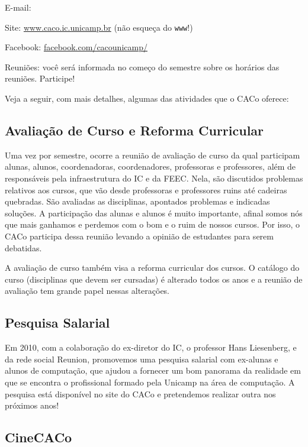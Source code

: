 \begin{compactitemize}
\item E-mail: 
\item Site: \url{www.caco.ic.unicamp.br} (não esqueça do \texttt{www}!)
\item Facebook: \url{facebook.com/cacounicamp/}
\item Reuniões: você será informada no começo do semestre sobre os horários das
reuniões. Participe!
\end{compactitemize}

Veja a seguir, com mais detalhes, algumas das atividades que o CACo oferece:

\subsection{Avaliação de Curso e Reforma Curricular}

Uma vez por semestre, ocorre a reunião de avaliação de curso da qual participam
alunas, alunos, coordenadoras, coordenadores, professoras e professores, além
de responsáveis pela infraestrutura do IC e da FEEC. Nela, são discutidos
problemas relativos aos cursos, que vão desde professoras e professores ruins
até cadeiras quebradas. São avaliadas as disciplinas, apontados problemas e
indicadas soluções. A participação das alunas e alunos é muito importante,
afinal somos nós que mais ganhamos e perdemos com o bom e o ruim de nossos
cursos. Por isso, o CACo participa dessa reunião levando a opinião de
estudantes para serem debatidas.

A avaliação de curso também visa a reforma curricular dos cursos. O catálogo do
curso (disciplinas que devem ser cursadas) é alterado todos os anos e a reunião
de avaliação tem grande papel nessas alterações.

\subsection{Pesquisa Salarial}

Em 2010, com a colaboração do ex-diretor do IC, o professor Hans Liesenberg, e
da rede social Reunion, promovemos uma pesquisa salarial com ex-alunas e alunos
de computação, que ajudou a fornecer um bom panorama da realidade em que se
encontra o profissional formado pela Unicamp na área de computação. A pesquisa
está disponível no site do CACo e pretendemos realizar outra nos próximos anos!

\subsection{CineCACo}

